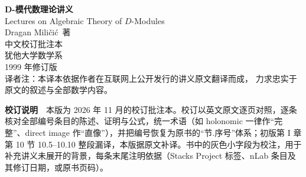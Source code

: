 \begin{titlepage}
\centering
\vspace*{1.4cm}

{\Huge\bfseries D-模代数理论讲义}\\[1.1cm]

{\Large Lectures on Algebraic Theory of $D$-Modules}\\[1.6cm]

{\large Dragan Miličić\ 著}\\[0.5cm]

{\large 中文校订批注本}\\[2cm]

{\normalsize 犹他大学数学系}\\[0.35cm]

{\normalsize 1999 年修订版}\\[1.6cm]

{\small 译者注：本译本依据作者在互联网上公开发行的讲义原文翻译而成，
力求忠实于原文的叙述与全部数学内容。}\\[1.2cm]

\begin{minipage}{0.86\textwidth}
\small
\textbf{校订说明}　本版为 2026 年 11 月的校订批注本。校订以英文原文逐页对照，逐条核对全部编号条目的陈述、证明与公式，统一术语（如 holonomic 一律作“完整”、direct image 作“直像”），并把编号恢复为原书的“节.序号”体系；初版第 I 章第 10 节 10.5--10.10 整段漏译，本版据原文补译。书中的灰色小字段为校注，用于补充讲义未展开的背景，每条末尾注明依据（Stacks Project 标签、nLab 条目及其修订日期，或原书页码）。
\end{minipage}

\vfill
\end{titlepage}
